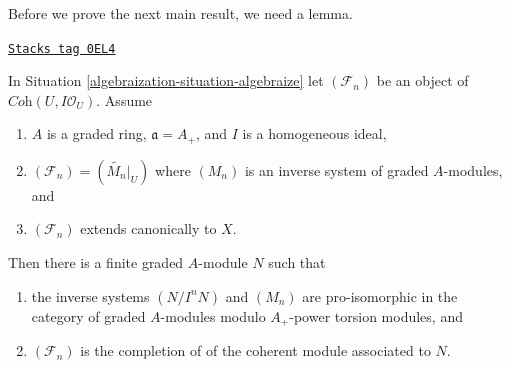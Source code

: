 Before we prove the next main result, we need a lemma.

\begin{lemma}
\label{algebraization-lemma-Gm-equivariant-extend-canonically}
\href{https://stacks.math.columbia.edu/tag/0EL4}{\texttt{Stacks tag 0EL4}}

In Situation \ref{algebraization-situation-algebraize} let $(\mathcal{F}_n)$ be an
object of $\textit{Coh}(U, I\mathcal{O}_U)$. Assume
\begin{enumerate}
\item $A$ is a graded ring, $\mathfrak a = A_+$, and
$I$ is a homogeneous ideal,
\item $(\mathcal{F}_n) = (\widetilde{M_n}|_U)$ where $(M_n)$
is an inverse system of graded $A$-modules, and
\item $(\mathcal{F}_n)$ extends canonically to $X$.
\end{enumerate}
Then there is a finite graded $A$-module $N$ such that
\begin{enumerate}
\item[(a)] the inverse systems $(N/I^nN)$ and $(M_n)$ are pro-isomorphic
in the category of graded $A$-modules modulo $A_+$-power torsion
modules, and
\item[(b)] $(\mathcal{F}_n)$ is the completion of of the coherent
module associated to $N$.
\end{enumerate}
\end{lemma}

